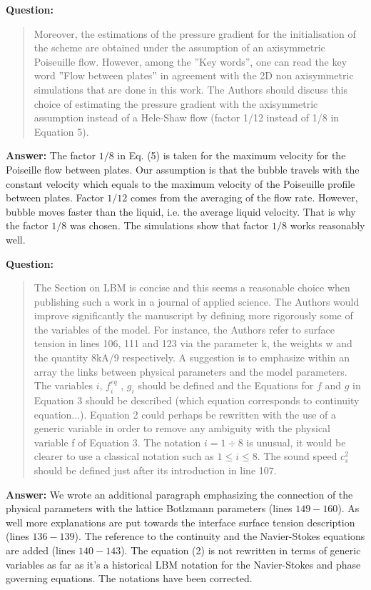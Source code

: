 \documentclass{article}
\begin{document}
\textbf{Question:}
\begin{quotation}
 Moreover, the estimations of the pressure gradient for the initialisation of the scheme are
obtained
under the assumption of an axisymmetric Poiseuille flow. However, among the ”Key words”, one can
read the key word ”Flow between plates” in agreement with the 2D non axisymmetric simulations
that are done in this work. The Authors should discuss this choice of estimating the pressure
gradient with the axisymmetric assumption instead of a Hele-Shaw flow (factor 1/12 instead of 1/8
in Equation 5).
\end{quotation}

\textbf{Answer:} The factor $1/8$ in Eq. (5) is taken for the maximum velocity for the Poiseille
flow between
plates. Our assumption is that the bubble travels with the constant velocity which equals to the
maximum velocity of the Poiseuille profile between plates. Factor $1/12$ comes from the averaging
of the flow rate. However, bubble moves faster than the liquid, i.e. the average liquid velocity.
That is why the factor $1/8$ was chosen. The simulations show that factor $1/8$ works reasonably
well.

\textbf{Question:}
\begin{quotation}
The Section on LBM is concise and this seems a reasonable choice when publishing such a work in a
journal of applied science. The Authors would improve signiﬁcantly the manuscript by defining more
rigorously some of the variables of the model. For instance, the Authors refer to surface tension in
lines 106, 111 and 123 via the parameter k, the weights w and the quantity 8kA/9 respectively.
A suggestion is to emphasize within an array the links between physical parameters and the model
parameters. The variables $i$, $f_i^{eq}$ , $g_i$ should be deﬁned and the Equations for $f$ and $g$
in Equation
3 should be described (which equation corresponds to continuity equation...). Equation 2 could
perhaps be rewritten with the use of a generic variable in order to remove any ambiguity with the
physical variable f of Equation 3. The notation $i = 1 \div 8$ is unusual, it would be clearer to
use a
classical notation such as $1 \leq i \leq 8$. The sound speed $c_s^2$ should be deﬁned just after
its
introduction in line 107.
\end{quotation}

\textbf{Answer:} We wrote an additional paragraph emphasizing the connection of the
physical parameters with the lattice Botlzmann parameters (lines $149-160$). As well more
explanations are
put towards the
interface surface tension description (lines $136-139$). The reference to the
continuity and the Navier-Stokes equations are added (lines $140-143$). The equation (2) is not
rewritten in terms of
generic variables as far as it's a historical LBM notation for the Navier-Stokes and phase
governing equations. The notations have been corrected.
\end{document}
